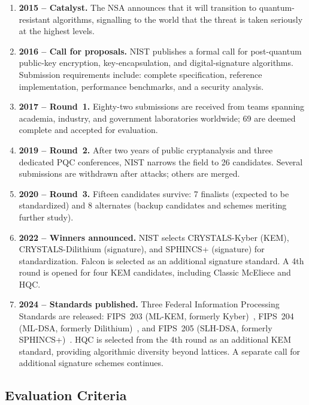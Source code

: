\begin{enumerate}
\item \textbf{2015 -- Catalyst.}  The NSA announces that it will transition to quantum-resistant algorithms, signalling to the world that the threat is taken seriously at the highest levels.

\item \textbf{2016 -- Call for proposals.}  NIST publishes a formal call for post-quantum public-key encryption, key-encapsulation, and digital-signature algorithms.  Submission requirements include: complete specification, reference implementation, performance benchmarks, and a security analysis.

\item \textbf{2017 -- Round~1.}  Eighty-two submissions are received from teams spanning academia, industry, and government laboratories worldwide; 69 are deemed complete and accepted for evaluation.

\item \textbf{2019 -- Round~2.}  After two years of public cryptanalysis and three dedicated PQC conferences, NIST narrows the field to 26 candidates.  Several submissions are withdrawn after attacks; others are merged.

\item \textbf{2020 -- Round~3.}  Fifteen candidates survive: 7 finalists (expected to be standardized) and 8 alternates (backup candidates and schemes meriting further study).

\item \textbf{2022 -- Winners announced.}  NIST selects CRYSTALS-Kyber (KEM), CRYSTALS-Dilithium (signature), and SPHINCS+ (signature) for standardization.  Falcon is selected as an additional signature standard.  A 4th round is opened for four KEM candidates, including Classic McEliece and HQC.

\item \textbf{2024 -- Standards published.}  Three Federal Information Processing Standards are released: FIPS~203 (ML-KEM, formerly Kyber)~\cite{FIPS203}, FIPS~204 (ML-DSA, formerly Dilithium)~\cite{FIPS204}, and FIPS~205 (SLH-DSA, formerly SPHINCS+)~\cite{FIPS205}.  HQC is selected from the 4th round as an additional KEM standard, providing algorithmic diversity beyond lattices.  A separate call for additional signature schemes continues.
\end{enumerate}

\subsection{Evaluation Criteria}
\label{subsec:nist-criteria}

